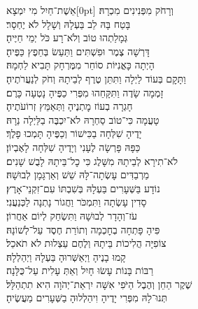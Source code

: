 \documentclass[11pt,twoside]{article}
\newcommand{\mekor}[2][0pt]{\marginnote{\rashi\tiny\scalebox{0.9}[1]{#2}}[#1]}
\newcommand{\highlight}[1]{\textcolor[HTML]{7F05A4}{#1}}
\begin{document}
{\centering\small%
\vspace{-0.1in}%
\par
\vspace{-0.3in}%
\highlight{אֵ}שֶׁת־חַיִל מִי יִמְצָא\mekor{משלי לא י}\hfill
וְרָחֹק מִפְּנִינִים מִכְרָהּ׃\\
\highlight{בָּ}טַח בָּהּ לֵב בַּעְלָהּ\hfill
וְשָׁלָל לֹא יֶחְסָר׃\\
\highlight{גְּ}מָלַתְהוּ טוֹב וְלֹא־רָע\hfill
כֹּל יְמֵי חַיֶּיהָ׃\\
\highlight{דָּ}רְשָׁה צֶמֶר וּפִשְׁתִּים\hfill
וַתַּעַשׂ בְּחֵפֶץ כַּפֶּיהָ׃\\
\highlight{הָ}יְתָה כׇּאֳנִיּוֹת סוֹחֵר\hfill
מִמֶּרְחָק תָּבִיא לַחְמָהּ׃\\
\highlight{וַ}תָּקׇם בְּעוֹד לַיְלָה\hfill
וַתִּתֵּן טֶרֶף לְבֵיתָהּ וְחֹק לְנַעֲרֹתֶיהָ׃\\
\highlight{זָ}מְמָה שָׂדֶה וַתִּקָּחֵהוּ\hfill
מִפְּרִי כַפֶּיהָ נָטְעָה כָּרֶם׃\\
\highlight{חָ}גְרָה בְעוֹז מׇתְנֶיהָ\hfill
וַתְּאַמֵּץ זְרוֹעֹתֶיהָ׃\\
\highlight{טָ}עֲמָה כִּי־טוֹב סַחְרָהּ\hfill
לֹא־יִכְבֶּה בַלַּיְלָה נֵרָהּ׃\\
\highlight{יָ}דֶיהָ שִׁלְּחָה בַכִּישׁוֹר\hfill
וְכַפֶּיהָ תָּמְכוּ פָלֶךְ׃\\
\highlight{כַּ}פָּהּ פָּרְשָׂה לֶעָנִי\hfill
וְיָדֶיהָ שִׁלְּחָה לָאֶבְיוֹן׃\\
\highlight{לֹ}א־תִירָא לְבֵיתָהּ מִשָּׁלֶג\hfill
כִּי כׇל־בֵּיתָהּ לָבֻשׁ שָׁנִים׃\\
\highlight{מַ}רְבַדִּים עָשְׂתָה־לָּהּ\hfill
שֵׁשׁ וְאַרְגָּמָן לְבוּשָׁהּ׃\\
\highlight{נ}וֹדָע בַּשְּׁעָרִים בַּעְלָהּ\hfill
בְּשִׁבְתּוֹ עִם־זִקְנֵי־אָרֶץ׃\\
\highlight{סָ}דִין עָשְׂתָה וַתִּמְכֹּר\hfill
וַחֲגוֹר נָתְנָה לַכְּנַעֲנִי׃\\
\highlight{עֹ}ז־וְהָדָר לְבוּשָׁהּ\hfill
וַתִּשְׂחַק לְיוֹם אַחֲרוֹן׃\\
\highlight{פִּ}יהָ פָּתְחָה בְחׇכְמָה\hfill
וְתוֹרַת חֶסֶד עַל־לְשׁוֹנָהּ׃\\
\highlight{צ}וֹפִיָּה הֲלִיכוֹת בֵּיתָהּ\hfill
וְלֶחֶם עַצְלוּת לֹא תֹאכֵל׃\\
\highlight{קָ}מוּ בָנֶיהָ וַיְאַשְּׁרוּהָ\hfill
בַּעְלָהּ וַיְהַלְלָהּ׃\\
\highlight{רַ}בּוֹת בָּנוֹת עָשׂוּ חָיִל\hfill
וְאַתְּ עָלִית עַל־כֻּלָּנָה׃\\
\highlight{שֶׁ}קֶר הַחֵן וְהֶבֶל הַיֹּפִי\hfill
אִשָּׁה יִרְאַת־יְהֹוָה הִיא תִתְהַלָּל׃\\
\highlight{תְּ}נוּ־לָהּ מִפְּרִי יָדֶיהָ\hfill
וִיהַלְלוּהָ בַשְּׁעָרִים מַעֲשֶׂיהָ׃\\
}
\end{document}
